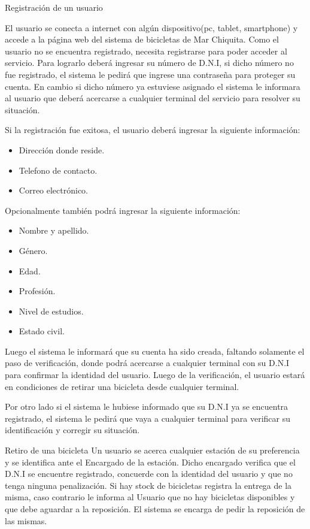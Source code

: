 
\begin{subsection}{Registración de un usuario}

El usuario se conecta a internet con algún dispositivo(pc, tablet, smartphone) y accede a la página
web del sistema de bicicletas de Mar Chiquita. Como el usuario no se encuentra registrado, necesita 
registrarse para poder acceder al servicio. Para lograrlo deberá ingresar su número de D.N.I, si dicho
número no fue registrado, el sistema le pedirá que ingrese una contraseña para proteger su cuenta. En cambio
si dicho número ya estuviese asignado el sistema le informara al usuario que deberá acercarse a cualquier
terminal del servicio para resolver su situación.

Si la registración fue exitosa, el usuario deberá ingresar la siguiente información:
	\begin{itemize}
	\item Dirección donde reside.
	\item Telefono de contacto.
	\item Correo electrónico.
	\end{itemize}
	
Opcionalmente también podrá ingresar la siguiente información:

	\begin{itemize}
	\item Nombre y apellido.
	\item Género.
	\item Edad.
	\item Profesión.
	\item Nivel de estudios.
	\item Estado civil.
	\end{itemize}
	
Luego el sistema le informará que su cuenta ha sido creada, faltando solamente el paso de verificación, donde
podrá acercarse a cualquier terminal con su D.N.I para confirmar la identidad del usuario. Luego de la 
verificación, el usuario estará en condiciones de retirar una bicicleta desde cualquier terminal.

Por otro lado si el sistema le hubiese informado que su D.N.I ya se encuentra registrado, el sistema le pedirá
que vaya a cualquier terminal para verificar su identificación y corregir su situación.
\end{subsection} 

\begin{subsection}{Retiro de una bicicleta}
Un usuario se acerca cualquier estación de su preferencia y se identifica ante el Encargado de la estación.
Dicho encargado verifica que el D.N.I se encuentre registrado, concuerde con la identidad del usuario y que no tenga ninguna penalización. Si hay stock de bicicletas registra la entrega de la misma, caso contrario le informa al Usuario que no hay bicicletas disponibles y que debe aguardar a la reposición. El sistema se encarga de pedir la reposición de las mismas.

\end{subsection} 

